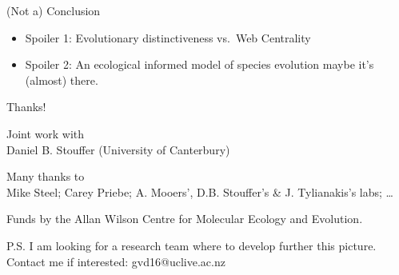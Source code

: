 \documentclass[ignorenonframetext,]{beamer}
\begin{document}
\begin{frame}{(Not a) Conclusion}

\begin{itemize}[<+->]
\item
  Spoiler 1: Evolutionary distinctiveness vs.~Web Centrality
\item
  Spoiler 2: An ecological informed model of species evolution maybe
  it's (almost) there.
\end{itemize}

\end{frame}

\begin{frame}{Thanks!}

Joint work with\\Daniel B. Stouffer (University of Canterbury)

Many thanks to\\Mike Steel; Carey Priebe; A. Mooers', D.B. Stouffer's \&
J. Tylianakis's labs; \ldots{}

Funds by the Allan Wilson Centre for Molecular Ecology and Evolution.

P.S. I am looking for a research team where to develop further this
picture. Contact me if interested: gvd16@uclive.ac.nz

\end{frame}
\end{document}
